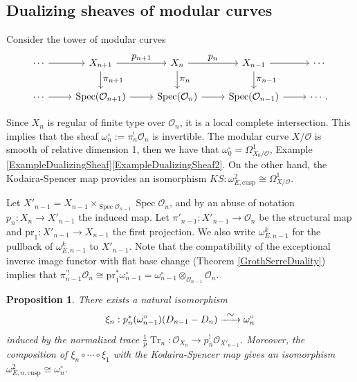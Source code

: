 \documentclass[JEP,XML,SOM,Unicode,published]{cedram}
\newcommand\To[1]{\mathchoice{\xrightarrow{\textstyle\kern4pt#1\kern3pt}}{\stackrel{#1}{\to}}{}{}}
\let\ts\textstyle
\newcommand{\cusp}{\mathrm{cusp}}
\newcommand{\pr}{\mathrm{pr}}
\numberwithin{equation}{section}
\newtheorem{prop}{Proposition}[section]
\theoremstyle{definition}
\newcommand{\n}[1]{\mathcal{#1}}
\newcommand{\s}[1]{\mathscr{#1}}
\DeclareMathOperator{\Tr}{Tr}
\DeclareMathOperator{\Spec}{Spec}
\begin{document}
\subsection*{Dualizing sheaves of modular curves}

Consider the tower of modular curves
\[
\begin{tikzcd}
\cdots \ar[r] & X_{n+1} \ar[r,"\ts p_{n+1}"] \ar[d, "\ts \pi_{n+1}"]& X_n \ar[r,"\ts p_n"] \ar[d, "\ts \pi_n"]& X_{n-1} \ar[r] \ar[d, "\ts \pi_{n-1}"] & \cdots \\
\cdots \ar[r] & \Spec(\n{O}_{n+1}) \ar[r] & \Spec(\n{O}_{n}) \ar[r] & \Spec(\n{O}_{n-1}) \ar[r] & \cdots.
\end{tikzcd}
\]

Since $X_n$ is regular of finite type over $\n{O}_n$, it is a local complete intersection. This implies that the sheaf $\omega^{\circ}_n:= \pi_{n}^! \n{O}_n$ is invertible.
The modular curve $X/\n{O}$ is smooth of relative dimension 1, then we have that $\omega_{0}^\circ = \Omega_{X_0/\n{O}}^1$, \cf Example \ref{ExampleDualizingSheaf}\eqref{ExampleDualizingSheaf2}. On the other hand, the Kodaira-Spencer map provides an isomorphism $KS:\omega^2_{E,\cusp}\cong \Omega^1_{X/\n{O}}$.

Let $X'_{n-1}= X_{n-1}\times_{\Spec \n{O}_{n-1}}\Spec \n{O}_n$, and by an abuse of notation $p_n: X_{n}\to X'_{n-1}$ the induced map. Let $\pi'_{n-1}: X'_{n-1}\to \n{O}_n$ be the structural map and $\pr_1: X'_{n-1}\to X_{n-1}$ the first projection. We also write $\omega_{E,n-1}^k$ for the pullback of $\omega_{E,n-1}^k$ to $X'_{n-1}$. Note that the compatibility of the exceptional inverse image functor with flat base change (Theorem \ref{GrothSerreDuality}) implies that $\pi^{'!}_{n-1} \n{O}_n\cong \pr_1^{*} \omega_{n-1}^{\circ}= \omega_{n-1}^{\circ}\otimes_{\n{O}_{n-1}}\n{O}_n$.

\begin{prop}
\label{isoDualizingModforms}
There exists a natural isomorphism
\[
\xi_n: p_{n}^*(\omega_{n-1}^{\circ})(D_{n-1}-D_n)\To{\sim} \omega_n^{\circ}
\]
induced by the normalized trace $\frac{1}{p}\Tr_n:\s{O}_{X_n}\to p_n^! \s{O}_{X'_{n-1}}$. Moreover, the composition of $ \xi_n \circ \cdots \circ \xi_1$ with the Kodaira-Spencer map gives an isomorphism $\omega^2_{E,n,\cusp}\cong \omega^{\circ}_n$.
\end{prop}
\end{document}
